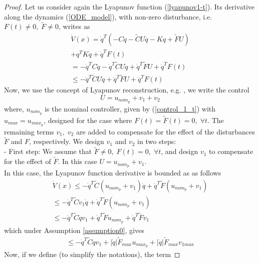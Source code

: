 \documentclass[letterpaper, 11 pt, conference]{ieeeconf}
\begin{document}
\begin{proof}
Let us consider again the Lyapunov function (\ref{lyapunov1-t}).
Its derivative along the dynamics (\ref{ODE_model}), with non-zero
disturbance, i.e. $F(t)\neq 0,\;\tilde{F}\neq 0$, writes as
\begin{equation}\label{lyapunov_dot_3}
\begin{array}{l}
\dot{V}(x)=\dot{q}^{T}(-C\dot{q}-\tilde{C}U\dot{q}-Kq+\tilde{F}U)\\+q^{T}K\dot{q}+\dot{q}^{T}F(t)\\
\hspace{0cm}=-\dot{q}^{T}C\dot{q}-\dot{q}^{T}\tilde{C}U\dot{q}+\dot{q}^{T}\tilde{F}U
+\dot{q}^{T}F(t)
\\
\leq -\dot{q}^{T}\tilde{C}U\dot{q}+\dot{q}^{T}\tilde{F}U
+\dot{q}^{T}F(t)
\end{array}
\end{equation}
Now, we use the concept of Lyapunov reconstruction, e.g.
\cite{BL09-4}, we write the control
\begin{equation}\label{total_control}
U=u_{nom_p}+v_{1}+v_{2}
\end{equation}
where, $u_{nom_p}$ is the nominal controller, given by
(\ref{control_1_t}) with $u_{max}=u_{max_p}$, designed for the
case where $F(t)=\tilde{F}(t)=0,\;\forall t$. The remaining terms
$v_{1},\;v_{2}$ are added to compensate for the effect of the
disturbances $\tilde{F}$ and $F$, respectively. We design $v_{1}$
and $v_{2}$ in two steps:\\
- First step: We assume that $\tilde{F}\neq 0,\;F(t)=0,\;\forall
t$, and design $v_{1}$ to compensate for the effect of
$\tilde{F}$. In this case $U=u_{nom_p}+v_{1}$.\\In this case, the
Lyapunov function derivative is bounded as as follows
$$
\begin{array}{l} \dot{V}(x)\leq
-\dot{q}^{T}\tilde{C}(u_{nom_p}+v_{1})\dot{q}+\dot{q}^{T}\tilde{F}(u_{nom_p}+v_{1})
\\
\leq
-\dot{q}^{T}\tilde{C}v_{1}\dot{q}+\dot{q}^{T}\tilde{F}(u_{nom_p}+v_{1})
\\\leq -\dot{q}^{T}\tilde{C}\dot{q}v_{1}+\dot{q}^{T}\tilde{F}u_{nom_p}+\dot{q}^{T}\tilde{F}v_{1}
\end{array}
$$
 which under Assumption \ref{assumption0}, gives
$$
\begin{array}{l}
\leq
-\dot{q}^{T}\tilde{C}\dot{q}v_{1}+|\dot{q}|\tilde{F}_{max}u_{max_p}+|\dot{q}|\tilde{F}_{max}v_{1max}
\end{array}
$$
Now, if we define (to simplify the notations), the term

\end{proof}
\end{document}
